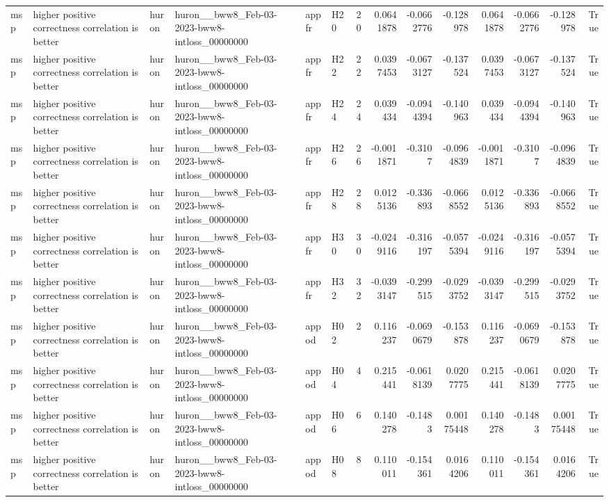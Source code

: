 \begin{longtable}{llllllrrrrrrrr}
msp & higher positive correctness correlation is better & huron & huron\_\_bww8\_Feb-03-2023-bww8-intloss\_00000000 & appfr & H20 & 20 & 0.0641878 & -0.0662776 & -0.128978 & 0.0641878 & -0.0662776 & -0.128978 & True \\
msp & higher positive correctness correlation is better & huron & huron\_\_bww8\_Feb-03-2023-bww8-intloss\_00000000 & appfr & H22 & 22 & 0.0397453 & -0.0673127 & -0.137524 & 0.0397453 & -0.0673127 & -0.137524 & True \\
msp & higher positive correctness correlation is better & huron & huron\_\_bww8\_Feb-03-2023-bww8-intloss\_00000000 & appfr & H24 & 24 & 0.039434 & -0.0944394 & -0.140963 & 0.039434 & -0.0944394 & -0.140963 & True \\
msp & higher positive correctness correlation is better & huron & huron\_\_bww8\_Feb-03-2023-bww8-intloss\_00000000 & appfr & H26 & 26 & -0.0011871 & -0.3107 & -0.0964839 & -0.0011871 & -0.3107 & -0.0964839 & True \\
msp & higher positive correctness correlation is better & huron & huron\_\_bww8\_Feb-03-2023-bww8-intloss\_00000000 & appfr & H28 & 28 & 0.0125136 & -0.336893 & -0.0668552 & 0.0125136 & -0.336893 & -0.0668552 & True \\
msp & higher positive correctness correlation is better & huron & huron\_\_bww8\_Feb-03-2023-bww8-intloss\_00000000 & appfr & H30 & 30 & -0.0249116 & -0.316197 & -0.0575394 & -0.0249116 & -0.316197 & -0.0575394 & True \\
msp & higher positive correctness correlation is better & huron & huron\_\_bww8\_Feb-03-2023-bww8-intloss\_00000000 & appfr & H32 & 32 & -0.0393147 & -0.299515 & -0.0293752 & -0.0393147 & -0.299515 & -0.0293752 & True \\
msp & higher positive correctness correlation is better & huron & huron\_\_bww8\_Feb-03-2023-bww8-intloss\_00000000 & appod & H02 & 2 & 0.116237 & -0.0690679 & -0.153878 & 0.116237 & -0.0690679 & -0.153878 & True \\
msp & higher positive correctness correlation is better & huron & huron\_\_bww8\_Feb-03-2023-bww8-intloss\_00000000 & appod & H04 & 4 & 0.215441 & -0.0618139 & 0.0207775 & 0.215441 & -0.0618139 & 0.0207775 & True \\
msp & higher positive correctness correlation is better & huron & huron\_\_bww8\_Feb-03-2023-bww8-intloss\_00000000 & appod & H06 & 6 & 0.140278 & -0.1483 & 0.00175448 & 0.140278 & -0.1483 & 0.00175448 & True \\
msp & higher positive correctness correlation is better & huron & huron\_\_bww8\_Feb-03-2023-bww8-intloss\_00000000 & appod & H08 & 8 & 0.110011 & -0.154361 & 0.0164206 & 0.110011 & -0.154361 & 0.0164206 & True \\

\end{longtable}

